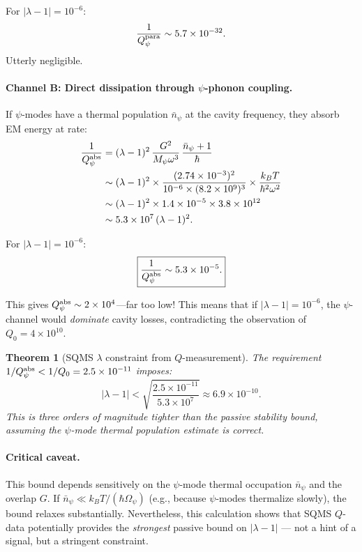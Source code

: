 \documentclass[11pt,twocolumn]{article}
\newcommand{\lam}{\lambda}
\newcommand{\Opsi}{\Omega_\psi}
\newcommand{\Mpsi}{M_\psi}
\newtheorem{theorem}{Theorem}
\begin{document}
For $|\lam-1| = 10^{-6}$:
\begin{equation}
\frac{1}{Q_\psi^{\rm para}} \sim 5.7\times10^{-32}.
\end{equation}
Utterly negligible.

\paragraph{Channel B: Direct dissipation through $\psi$-phonon coupling.}
If $\psi$-modes have a thermal population $\bar{n}_\psi$ at the cavity
frequency, they absorb EM energy at rate:
\begin{align}
\frac{1}{Q_\psi^{\rm abs}} &= (\lam-1)^2\,\frac{G^2}{\Mpsi\omega^3}
\,\frac{\bar{n}_\psi + 1}{\hbar}
\nonumber\\
&\sim (\lam-1)^2 \times \frac{(2.74\times10^{-3})^2}
{10^{-6} \times (8.2\times10^9)^3}
\times \frac{k_BT}{\hbar^2\omega^2}
\nonumber\\
&\sim (\lam-1)^2 \times 1.4\times10^{-5} \times 3.8\times10^{12}
\nonumber\\
&\sim 5.3\times10^{7}\,(\lam-1)^2.
\end{align}

For $|\lam-1| = 10^{-6}$:
\begin{equation}
\boxed{\frac{1}{Q_\psi^{\rm abs}} \sim 5.3\times10^{-5}.}
\end{equation}

This gives $Q_\psi^{\rm abs} \sim 2\times10^{4}$---far too low!
This means that if $|\lam-1| = 10^{-6}$, the $\psi$-channel would
\emph{dominate} cavity losses, contradicting the observation of
$Q_0 = 4\times10^{10}$.

\begin{theorem}[SQMS $\lam$ constraint from $Q$-measurement]
\label{thm:sqms_constraint}
The requirement $1/Q_\psi^{\rm abs} < 1/Q_0 = 2.5\times10^{-11}$
imposes:
\begin{equation}
\boxed{|\lam-1| < \sqrt{\frac{2.5\times10^{-11}}{5.3\times10^{7}}}
\approx 6.9\times10^{-10}.}
\label{eq:sqms_bound}
\end{equation}
This is three orders of magnitude tighter than the passive stability
bound, assuming the $\psi$-mode thermal population estimate is correct.
\end{theorem}

\paragraph{Critical caveat.} This bound depends sensitively on the
$\psi$-mode thermal occupation $\bar{n}_\psi$ and the overlap $G$.
If $\bar{n}_\psi \ll k_BT/(\hbar\Opsi)$ (e.g., because $\psi$-modes
thermalize slowly), the bound relaxes substantially. Nevertheless,
this calculation shows that SQMS $Q$-data potentially provides the
\emph{strongest} passive bound on $|\lam-1|$ --- not a hint of a
signal, but a stringent constraint.
\end{document}

